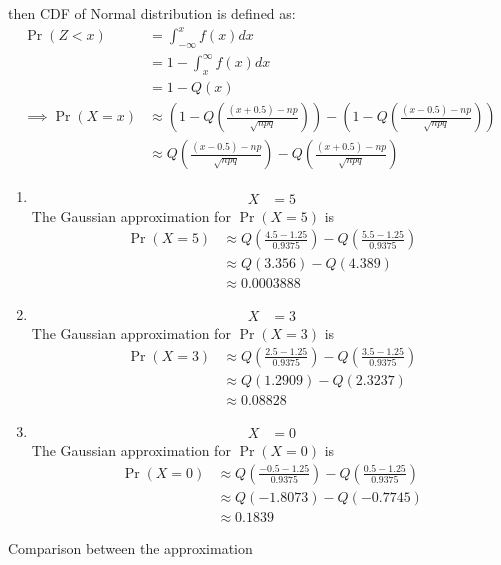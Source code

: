 \documentclass[journal,11pt,onecolumn]{IEEEtran}
\providecommand{\pr}[1]{\ensuremath{\Pr\left(#1\right)}}
\providecommand{\qfunc}[1]{\ensuremath{Q\left(#1\right)}}
\providecommand{\brak}[1]{\ensuremath{\left(#1\right)}}
\providecommand{\pr}[1]{\ensuremath{\Pr\left(#1\right)}}
\providecommand{\qfunc}[1]{\ensuremath{Q\left(#1\right)}}
\providecommand{\qfunc}[1]{\ensuremath{Q\left(#1\right)}}
\begin{document}
then CDF of Normal distribution is defined as:
\begin{align}
	\pr{Z<x}&=\int_{-\infty}^x f\brak{x} dx\\
	&=1-\int_x^{\infty}f\brak{x}dx\\
	&=1-\qfunc{x}\\
	\implies \pr{X=x} &\approx \brak{1-\qfunc{\frac{\brak{x+0.5}-np}{\sqrt{npq}}}} - \brak{1-\qfunc{\frac{\brak{x-0.5}-np}{\sqrt{npq}}}}\\
	&\approx \qfunc{\frac{\brak{x-0.5}-np}{\sqrt{npq}}} -\qfunc{\frac{\brak{x+0.5}-np}{\sqrt{npq}}}
\end{align}
\begin{enumerate}
	\item 
	\begin{align}
		X&=5
	\end{align}
	The Gaussian approximation for \pr{X=5} is
	\begin{align}
	\pr{X=5}&\approx \qfunc{\frac{4.5 - 1.25}{0.9375}} -\qfunc{\frac{5.5 -1.25}{0.9375}}\\
	&\approx \qfunc{3.356} - \qfunc{4.389}\\
	&\approx 0.0003888
	\end{align}
	\item 
	\begin{align}
		X&=3
	\end{align}
	The Gaussian approximation for \pr{X=3} is
	\begin{align}
	\pr{X=3} &\approx \qfunc{\frac{2.5 - 1.25}{0.9375}} -\qfunc{\frac{3.5 -1.25}{0.9375}}\\
	&\approx \qfunc{1.2909} - \qfunc{2.3237}\\
	&\approx 0.08828
	\end{align}
	\item 
	\begin{align}
		X&=0
	\end{align}
	The Gaussian approximation for \pr{X=0} is
	\begin{align}
	\pr{X=0}
	&\approx \qfunc{\frac{-0.5 - 1.25}{0.9375}} -\qfunc{\frac{0.5 -1.25}{0.9375}}\\
	&\approx \qfunc{-1.8073} - \qfunc{-0.7745}\\
	&\approx 0.1839
	\end{align}
\end{enumerate}
\begin{table}[ht!]
	\centering
	
	\caption{Comparison between the approximation}
	\label{tab:table1gauss9.3.3}
\end{table}
\end{document}
